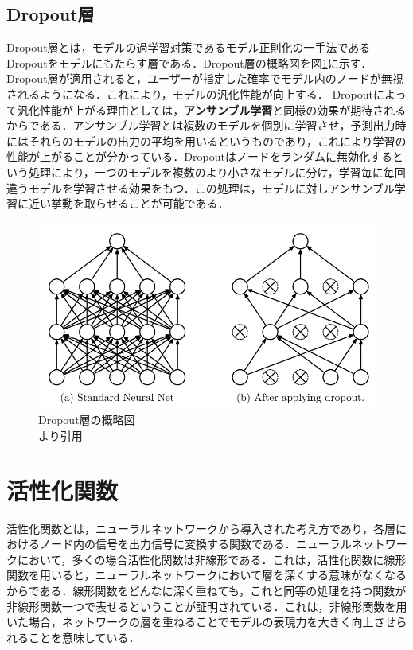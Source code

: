 \documentclass[a4j, 11pt]{jreport}
\begin{document}
\subsection{Dropout層}
Dropout層とは，モデルの過学習対策であるモデル正則化の一手法であるDropout\cite{Srivastava2014}をモデルにもたらす層である．Dropout層の概略図を図\ref{fig:dropout}に示す．Dropout層が適用されると，ユーザーが指定した確率でモデル内のノードが無視されるようになる．これにより，モデルの汎化性能が向上する．
Dropoutによって汎化性能が上がる理由としては，\textbf{アンサンブル学習}と同様の効果が期待されるからである．アンサンブル学習とは複数のモデルを個別に学習させ，予測出力時にはそれらのモデルの出力の平均を用いるというものであり，これにより学習の性能が上がることが分かっている．Dropoutはノードをランダムに無効化するという処理により，一つのモデルを複数のより小さなモデルに分け，学習毎に毎回違うモデルを学習させる効果をもつ．この処理は，モデルに対しアンサンブル学習に近い挙動を取らせることが可能である．

\begin{figure}[H]
 \centering
 \includegraphics[width=0.8\hsize, keepaspectratio]{images/dropout.png}
 \caption{Dropout層の概略図\\\cite{Srivastava2014}より引用}
 \label{fig:dropout}
\end{figure}


\section{活性化関数}
活性化関数とは，ニューラルネットワークから導入された考え方であり，各層におけるノード内の信号を出力信号に変換する関数である．ニューラルネットワークにおいて，多くの場合活性化関数は非線形である．これは，活性化関数に線形関数を用いると，ニューラルネットワークにおいて層を深くする意味がなくなるからである．線形関数をどんなに深く重ねても，これと同等の処理を持つ関数が非線形関数一つで表せるということが証明されている．これは，非線形関数を用いた場合，ネットワークの層を重ねることでモデルの表現力を大きく向上させられることを意味している．
\end{document}

